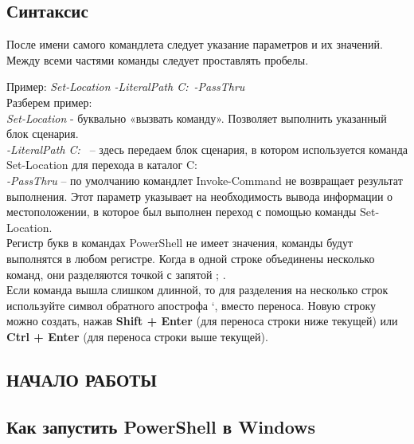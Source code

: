 \documentclass[12pt, a4paper, twoside]{article}
\begin{document}
\begin{center}
\subsection{Синтаксис}
\end{center}

После имени самого командлета следует указание параметров и их значений. Между всеми частями команды следует проставлять пробелы.

Пример: \textit{Set-Location -LiteralPath C:\ -PassThru}\\

Разберем пример:\\

\textit{Set-Location} - буквально «вызвать команду». Позволяет выполнить указанный блок сценария.\\

\textit{-LiteralPath C:\ } – здесь передаем блок сценария, в котором используется команда Set-Location для перехода в каталог C:\.\\

\textit{-PassThru} – по умолчанию командлет Invoke-Command не возвращает результат выполнения. Этот параметр указывает на необходимость вывода информации о местоположении, в которое был выполнен переход с помощью команды Set-Location.\\

\newpage
Регистр букв в командах PowerShell не имеет значения, команды будут выполнятся в любом регистре. Когда в одной строке объединены несколько команд, они разделяются точкой с запятой 
\colorbox{light-gray}{;} .\\

Если команда вышла слишком длинной, то для разделения на несколько строк используйте символ обратного апострофа 
\colorbox{light-gray}{`}, вместо переноса. Новую строку можно создать, нажав \textbf{Shift + Enter} (для переноса строки ниже текущей) или \textbf{Ctrl + Enter} (для переноса строки выше текущей). \\

\newpage
\begin{center}
\section{НАЧАЛО РАБОТЫ}
\subsection{Как запустить PowerShell в Windows}
\end{center}
\end{document}
